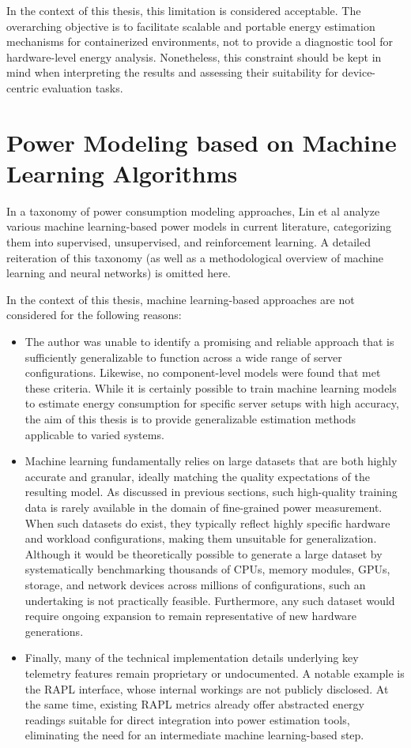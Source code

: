 In the context of this thesis, this limitation is considered acceptable. The overarching objective is to facilitate scalable and portable energy estimation mechanisms for containerized environments, not to provide a diagnostic tool for hardware-level energy analysis. Nonetheless, this constraint should be kept in mind when interpreting the results and assessing their suitability for device-centric evaluation tasks.

\section{Power Modeling based on Machine Learning Algorithms}

In a taxonomy of power consumption modeling approaches, Lin et al\parencite{lin2020taxonomy} analyze various machine learning-based power models in current literature, categorizing them into supervised, unsupervised, and reinforcement learning. A detailed reiteration of this taxonomy (as well as a methodological overview of machine learning and neural networks) is omitted here.

In the context of this thesis, machine learning-based approaches are not considered for the following reasons:
\begin{itemize}
\item The author was unable to identify a promising and reliable approach that is sufficiently generalizable to function across a wide range of server configurations. Likewise, no component-level models were found that met these criteria. While it is certainly possible to train machine learning models to estimate energy consumption for specific server setups with high accuracy, the aim of this thesis is to provide generalizable estimation methods applicable to varied systems.
\item Machine learning fundamentally relies on large datasets that are both highly accurate and granular, ideally matching the quality expectations of the resulting model. As discussed in previous sections, such high-quality training data is rarely available in the domain of fine-grained power measurement. When such datasets do exist, they typically reflect highly specific hardware and workload configurations, making them unsuitable for generalization. Although it would be theoretically possible to generate a large dataset by systematically benchmarking thousands of CPUs, memory modules, GPUs, storage, and network devices across millions of configurations, such an undertaking is not practically feasible. Furthermore, any such dataset would require ongoing expansion to remain representative of new hardware generations.
\item Finally, many of the technical implementation details underlying key telemetry features remain proprietary or undocumented. A notable example is the RAPL interface, whose internal workings are not publicly disclosed. At the same time, existing RAPL metrics already offer abstracted energy readings suitable for direct integration into power estimation tools, eliminating the need for an intermediate machine learning-based step.
\end{itemize}

